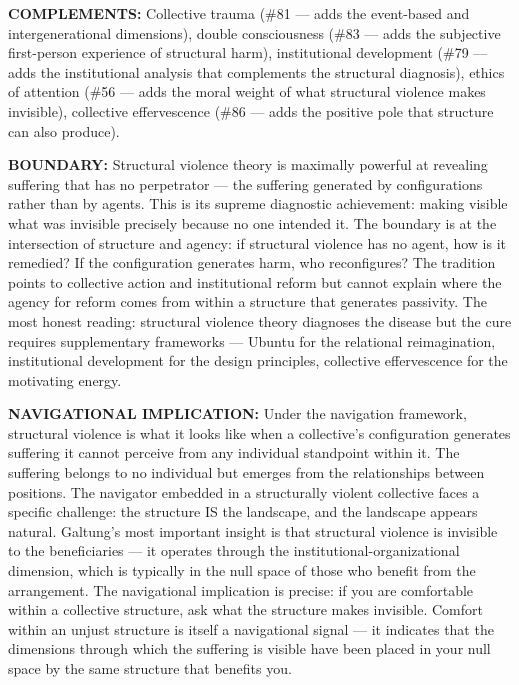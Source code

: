 \textbf{COMPLEMENTS:} Collective trauma (\#81 — adds the event-based and intergenerational dimensions), double consciousness (\#83 — adds the subjective first-person experience of structural harm), institutional development (\#79 — adds the institutional analysis that complements the structural diagnosis), ethics of attention (\#56 — adds the moral weight of what structural violence makes invisible), collective effervescence (\#86 — adds the positive pole that structure can also produce).


\textbf{BOUNDARY:} Structural violence theory is maximally powerful at revealing suffering that has no perpetrator — the suffering generated by configurations rather than by agents. This is its supreme diagnostic achievement: making visible what was invisible precisely because no one intended it. The boundary is at the intersection of structure and agency: if structural violence has no agent, how is it remedied? If the configuration generates harm, who reconfigures? The tradition points to collective action and institutional reform but cannot explain where the agency for reform comes from within a structure that generates passivity. The most honest reading: structural violence theory diagnoses the disease but the cure requires supplementary frameworks — Ubuntu for the relational reimagination, institutional development for the design principles, collective effervescence for the motivating energy.


\textbf{NAVIGATIONAL IMPLICATION:} Under the navigation framework, structural violence is what it looks like when a collective's configuration generates suffering it cannot perceive from any individual standpoint within it. The suffering belongs to no individual but emerges from the relationships between positions. The navigator embedded in a structurally violent collective faces a specific challenge: the structure IS the landscape, and the landscape appears natural. Galtung's most important insight is that structural violence is invisible to the beneficiaries — it operates through the institutional-organizational dimension, which is typically in the null space of those who benefit from the arrangement. The navigational implication is precise: if you are comfortable within a collective structure, ask what the structure makes invisible. Comfort within an unjust structure is itself a navigational signal — it indicates that the dimensions through which the suffering is visible have been placed in your null space by the same structure that benefits you.


\bigskip\noindent\makebox[\textwidth]{\color{rulegray}\rule{5cm}{0.3pt}}\bigskip


